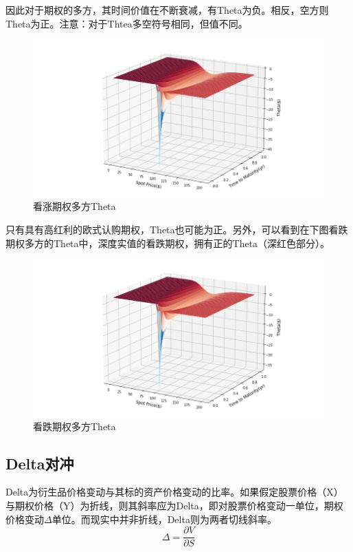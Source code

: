 \documentclass[11pt]{article}
\begin{document}
因此对于期权的多方，其时间价值在不断衰减，有Theta为负。相反，空方则Theta为正。注意：对于Thtea多空符号相同，但值不同。
\begin{figure}[H]
    \centering
    \includegraphics[width=\textwidth]{fig/theta_call_surf.png}
    \caption{看涨期权多方Theta}
    \label{fig:theta_call_surf}
\end{figure}

只有具有高红利的欧式认购期权，Theta也可能为正。另外，可以看到在下图看跌期权多方的Theta中，深度实值的看跌期权，拥有正的Theta（深红色部分）。
\begin{figure}[H]
    \centering
    \includegraphics[width=\textwidth]{fig/theta_put_surf.png}
    \caption{看跌期权多方Theta}
    \label{fig:theta_put_surf}
\end{figure}

\subsection{Delta对冲}

Delta为衍生品价格变动与其标的资产价格变动的比率。如果假定股票价格（X）与期权价格（Y）为折线，则其斜率应为Delta，即对股票价格变动一单位，期权价格变动$\Delta$单位。而现实中并非折线，Delta则为两者切线斜率。
\begin{equation*}
    \Delta = \frac{\partial V}{\partial S}
\end{equation*}
\end{document}
